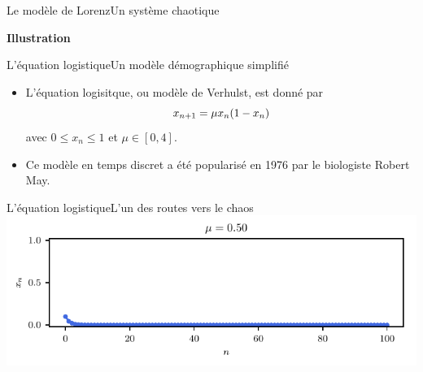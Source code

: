 \documentclass[usenames,dvipsnames,svgnames,10pt,aspectratio=169]{beamer}
\begin{document}
\begin{frame}[t, c]{Le modèle de Lorenz}{Un système chaotique}
	\centering

	\vspace{1cm}
\end{frame}

\begin{frame}[t, c]{}{}

	\centering

	{\Large \textbf{Illustration}}

	\bigskip


	\vspace{-2cm}
\end{frame}

\begin{frame}[t, c]{L'équation logistique}{Un modèle démographique simplifié}

	\begin{itemize}
		\item L'équation logisitque, ou modèle de Verhulst, est donné par
		\begin{equation}
			x_{n+1} = \mu x_n ( 1 - x_n)
			\notag
		\end{equation}
		avec $0 \le x_n \le 1$ et $\mu \in \left[ 0, 4 \right]$.

		\bigskip

		\item Ce modèle en temps discret a été popularisé en 1976 par le biologiste Robert May.
	\end{itemize}

	\vspace{1cm}
\end{frame}

\begin{frame}[t, c]{L'équation logistique}{L'un des routes vers le chaos}
	\centering
	\includegraphics[width=.75\textwidth]{logistic_map_0}
\end{frame}
\end{document}

